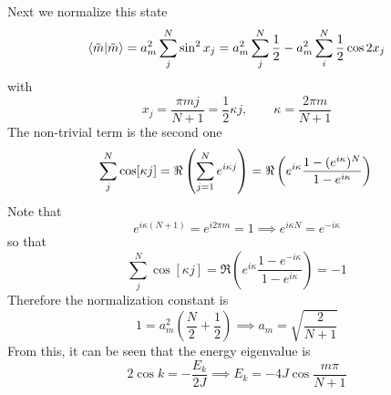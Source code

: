 \documentclass[../../../main.tex]{subfiles}
\begin{document}
Next we normalize this state
\begin{equation*}
    \braket{\tilde{m } |\tilde{m} } =  a_m^2\sum_{j } ^{N } \sin ^2 x_j = a_m^2\sum_{j } ^{N } \frac{1 }{2 } - a_m^2\sum_{i } ^{N } \frac{1 }{2 }\cos 2x_j
\end{equation*}
with
\begin{equation*}
    x_j = \frac{\pi m j}{N+1}  = \frac{1 }{2}\kappa j, \qquad \kappa = \frac{2\pi m }{N+1}
\end{equation*}
The non-trivial term is the second one
\begin{equation*}
    \sum_{j } ^{N } \cos [\kappa j] =  \Re\left(\sum_{j=1}^{N} e^{i\kappa j}\right)  = \Re \left(  e^{i\kappa }  \frac{1 - (e^{i\kappa })^{N}}{1 - e^{i\kappa }} \right) \\
\end{equation*}
Note that
\begin{equation*}
    e ^{i\kappa(N+1)} = e ^{i 2\pi m} =1\implies e ^{i \kappa N} = e^{-i\kappa}
\end{equation*}
so that
\begin{equation*}
    \sum_{j } ^{N } \cos [\kappa j]
    = \Re \left(  e^{i\kappa }  \frac{1 - e^{-i\kappa}}{1 - e^{i\kappa }} \right)
    = - 1
\end{equation*}
Therefore the normalization constant is
\begin{equation*}
    1 = a_m^2 \left( \frac{N }{2}+ \frac{1 }{2} \right) \implies a_m =  \sqrt{\frac{2 }{N+1}}
\end{equation*}
From this, it can be seen that the energy eigenvalue is
\begin{equation*}
    2 \cos k = -\frac{ E_k}{2J}  \implies E_k = - 4J \cos   \frac{m\pi}{N+1}
\end{equation*}
\end{document}

